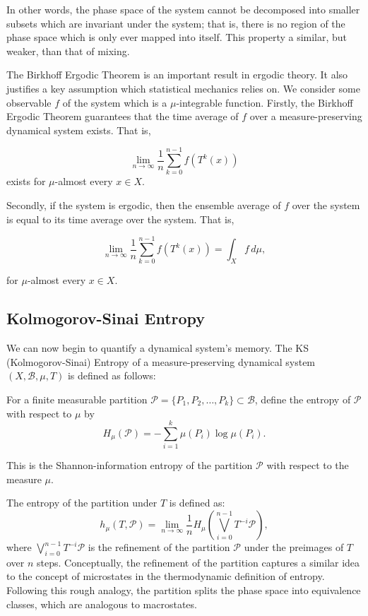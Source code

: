 \documentclass{article}
\begin{document}
In other words, the phase space of the system cannot be decomposed into smaller subsets which are invariant under the system; that is, there is no region of the phase space which is only ever mapped into itself. This property a similar, but weaker, than that of mixing.

The Birkhoff Ergodic Theorem is an important result in ergodic theory. It also justifies a key assumption which statistical mechanics relies on. We consider some observable $f$ of the system which is a $\mu$-integrable function. Firstly, the Birkhoff Ergodic Theorem guarantees that the time average of $f$ over a measure-preserving dynamical system exists. That is,

\[ \lim_{n \to \infty} \frac{1}{n} \sum_{k=0}^{n-1} f(T^k(x)) \]
exists for \(\mu\)-almost every \(x \in X\). 

Secondly, if the system is ergodic, then the ensemble average of $f$ over the system is equal to its time average over the system. That is, 

\[ \lim_{n \to \infty} \frac{1}{n} \sum_{k=0}^{n-1} f(T^k(x)) = \int_X f \, d\mu, \]

for \(\mu\)-almost every \(x \in X\). 

\subsection{Kolmogorov-Sinai Entropy}


We can now begin to quantify a dynamical system's memory. The KS (Kolmogorov-Sinai) Entropy of a measure-preserving dynamical system \((X, \mathcal{B}, \mu, T)\) is defined as follows:

For a finite measurable partition \(\mathcal{P} = \{P_1, P_2, \dots, P_k\} \subset \mathcal{B}\), define the entropy of \(\mathcal{P}\) with respect to \(\mu\) by
\[
H_\mu(\mathcal{P}) = -\sum_{i=1}^k \mu(P_i) \log \mu(P_i).
\]

This is the Shannon-information entropy of the partition $\mathcal{P}$ with respect to the measure $\mu$.

The entropy of the partition under $T$ is defined as:
\[
h_\mu(T, \mathcal{P}) = \lim_{n \to \infty} \frac{1}{n} H_\mu \left( \bigvee_{i=0}^{n-1} T^{-i} \mathcal{P} \right),
\]
where \(\bigvee_{i=0}^{n-1} T^{-i} \mathcal{P}\) is the refinement of the partition \(\mathcal{P}\) under the preimages of \(T\) over \(n\) steps. Conceptually, the refinement of the partition captures a similar idea to the concept of microstates in the thermodynamic definition of entropy. Following this rough analogy, the partition splits the phase space into equivalence classes, which are analogous to macrostates. 
\end{document}
